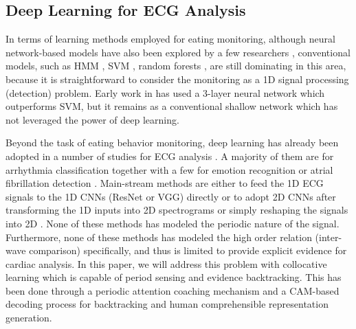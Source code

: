 	
	\subsection{Deep Learning for ECG Analysis}
	In terms of learning methods employed for eating monitoring, although neural network-based models have also been explored by a few researchers \cite{farooq2013comparative}, conventional models, such as HMM \cite{bi2015autodietary}, SVM \cite{lopez2010detection}, random forests \cite{fontana2013estimation}, are still dominating in this area, because it is straightforward to consider the monitoring as a 1D signal processing (detection) problem. Early work in \cite{farooq2013comparative} has used a 3-layer neural network 
	which outperforms SVM, but it remains as a conventional shallow network which has not leveraged the power of deep learning.
	
	Beyond the task of eating behavior monitoring, deep learning has already been adopted in a number of studies for ECG analysis \cite{al2018convolutional,andreotti2017comparing,fan2018multiscaled,hannun2019cardiologist,he2018automatic,naz2021ecg,sarkar2020self,ullah2020classification}. A majority of them are for arrhythmia classification \cite{andreotti2017comparing,hannun2019cardiologist} together with a few for emotion recognition \cite{sarkar2020self} or atrial fibrillation detection \cite{fan2018multiscaled}. Main-stream methods are either to feed the 1D ECG signals to the 1D CNNs (ResNet or VGG) directly \cite{andreotti2017comparing,hannun2019cardiologist,fan2018multiscaled} or to adopt 2D CNNs after transforming the 1D inputs into 2D spectrograms or simply reshaping the signals into 2D \cite{al2018convolutional,he2018automatic,naz2021ecg,ullah2020classification}. 
	None of these methods has modeled the periodic nature of the signal. Furthermore, 
	none of these methods has modeled the high order relation (inter-wave comparison) specifically, and thus is limited to provide explicit evidence for cardiac analysis. 
	In this paper, we will address this problem with collocative learning which is capable of period sensing and evidence backtracking. This has been done through a periodic attention coaching mechanism and a CAM-based decoding process for backtracking and human comprehensible representation generation.
	
